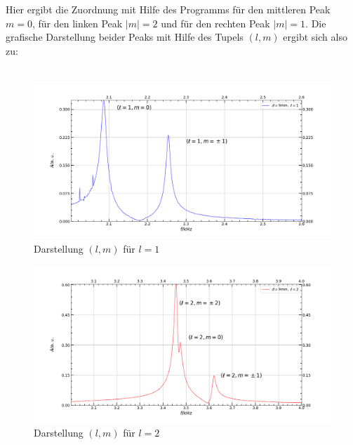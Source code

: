\documentclass[german,  %
parskip=full,  %
]{scrartcl}
\begin{document}
\\\\
Hier ergibt die Zuordnung mit Hilfe des Programms für den mittleren Peak $m=0$, für den linken Peak $|m|=2$ und für den rechten Peak $|m|=1$.
\newline Die grafische Darstellung beider Peaks mit Hilfe des Tupels $(l,m)$ ergibt sich also zu:
\\\\
\begin{figure}[h!]
\centering
\includegraphics[width=\textwidth]{445_fuer_l_gleich_1.png}
\caption{Darstellung $(l,m)$ für $l=1$}
\end{figure}
\begin{figure}[h!]
\centering
\includegraphics[width=\textwidth]{445_fuer_l_gleich_2.png}
\caption{Darstellung $(l,m)$ für $l=2$}
\end{figure}
\\\\
\end{document}
